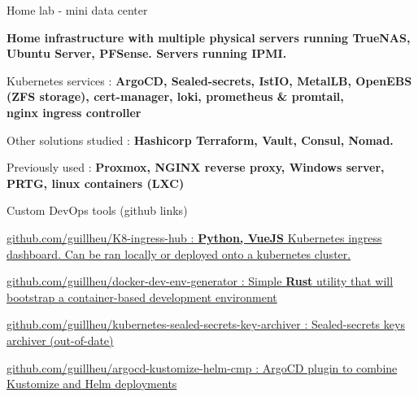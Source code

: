 
\begin{cventries}
  \cventry
    {} %
    {Home lab - mini data center} %
    {} %
    {} %
    {
      \begin{cvitems} %
        \item {\textbf{Home infrastructure with multiple physical servers running TrueNAS, Ubuntu Server, PFSense. Servers running IPMI.}}
        \item {Kubernetes services : \textbf{ArgoCD, Sealed-secrets, IstIO, MetalLB, OpenEBS (ZFS storage), cert-manager, loki, prometheus \& promtail,\\nginx ingress controller}}
        \item {Other solutions studied : \textbf{Hashicorp Terraform, Vault, Consul, Nomad.}}
        \item {Previously used : \textbf{Proxmox, NGINX reverse proxy, Windows server, PRTG, linux containers (LXC)}\\}
      \end{cvitems}
    }

  \cventry
  {} %
  {Custom DevOps tools (github links)} %
  {} %
  {} %
  {
    \begin{cvitems} %
      \item {\href{https://github.com/guillheu/K8-ingress-hub}{\underline{github.com/guillheu/K8-ingress-hub} : \textbf{Python, VueJS} Kubernetes ingress dashboard. Can be ran locally or deployed onto a kubernetes cluster.}}
      \item {\href{https://github.com/guillheu/docker-dev-env-generator}{\underline{github.com/guillheu/docker-dev-env-generator} : Simple \textbf{Rust} utility that will bootstrap a container-based development environment}}
      \item {\href{https://github.com/guillheu/kubernetes-sealed-secrets-key-archiver}{\underline{github.com/guillheu/kubernetes-sealed-secrets-key-archiver} : Sealed-secrets keys archiver (out-of-date)}}
      \item {\href{https://github.com/guillheu/argocd-kustomize-helm-cmp}{\underline{github.com/guillheu/argocd-kustomize-helm-cmp} : ArgoCD plugin to combine Kustomize and Helm deployments\\}}
    \end{cvitems}
  }
  

\end{cventries}
